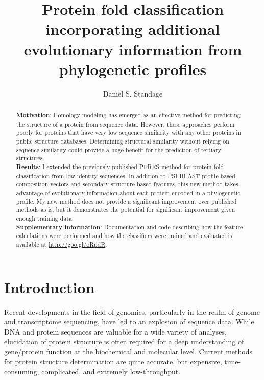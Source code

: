 \documentclass{bioinfo}
\begin{document}

\title[Protein fold classification]{Protein fold classification incorporating additional evolutionary information from phylogenetic profiles}
\author[Standage]{Daniel S. Standage}
\address{Department of Genetics, Development, and Cell Biology, Iowa State University, Ames, IA 50011}


\maketitle

\begin{abstract}
\noindent \textbf{Motivation}: Homology modeling has emerged as an effective method for predicting the structure of a protein from sequence data. However, these approaches perform poorly for proteins that have very low sequence similarity with any other proteins in public structure databases. Determining structural similarity without relying on sequence similarity could provide a huge benefit for the prediction of tertiary structures. \\
\noindent \textbf{Results}: I extended the previously published PFRES method for protein fold classification from low identity sequences. In addition to PSI-BLAST profile-based composition vectors and secondary-structure-based features, this new method takes advantage of evolutionary information about each protein encoded in a phylogenetic profile. My new method does not provide a significant improvement over published methods as is, but it demonstrates the potential for significant improvement given enough training data. \\
\noindent \textbf{Supplementary information}: Documentation and code describing how the feature calculations were performed and how the classifiers were trained and evaluated is available at \url{http://goo.gl/oRpdR}.
\end{abstract}

\section*{Introduction}
Recent developments in the field of genomics, particularly in the realm of genome and transcriptome sequencing, have led to an explosion of sequence data.
While DNA and protein sequences are valuable for a wide variety of analyses, elucidation of protein structure is often required for a deep understanding of gene/protein function at the biochemical and molecular level.
Current methods for protein structure determination are quite accurate, but expensive, time-consuming, complicated, and extremely low-throughput.
\end{document}

